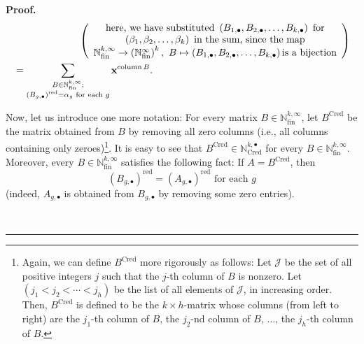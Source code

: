 \documentclass[numbers=enddot,12pt,final,onecolumn,notitlepage,abstracton]{scrartcl}%
\theoremstyle{definition}
\newenvironment{proof}[1][Proof]{\noindent\textbf{#1.} }{\ \rule{0.5em}{0.5em}}
\let\sumnonlimits\sum
\renewcommand{\sum}{\sumnonlimits\limits}
\begin{document}
\begin{proof}
\begin{align}
&  \ \ \ \ \ \ \ \ \ \ \ \ \ \ \ \ \ \ \ \ \left(
\begin{array}
[c]{c}%
\text{here, we have substituted }\left(  B_{1,\bullet},B_{2,\bullet}%
,\ldots,B_{k,\bullet}\right)  \text{ for}\\
\left(  \beta_{1},\beta_{2},\ldots,\beta_{k}\right)  \text{ in the sum, since
the map}\\
\mathbb{N}_{\operatorname*{fin}}^{k,\infty}\rightarrow\left(  \mathbb{N}%
_{\operatorname*{fin}}^{\infty}\right)  ^{k},\ B\mapsto\left(  B_{1,\bullet
},B_{2,\bullet},\ldots,B_{k,\bullet}\right)  \text{is a bijection}%
\end{array}
\right) \nonumber\\
&  =\sum_{\substack{B\in\mathbb{N}_{\operatorname*{fin}}^{k,\infty};\\\left(
B_{g,\bullet}\right)  ^{\operatorname*{red}}=\alpha_{g}\text{ for each }%
g}}\mathbf{x}^{\operatorname*{column}B}. \label{pf.prop.QSym.M*M*M.2}%
\end{align}


Now, let us introduce one more notation: For every matrix $B\in\mathbb{N}%
_{\operatorname*{fin}}^{k,\infty}$, let $B^{\operatorname*{Cred}}$ be the
matrix obtained from $B$ by removing all zero columns (i.e., all columns
containing only zeroes)\footnote{Again, we can define $B^{\operatorname*{Cred}%
}$ more rigorously as follows: Let $\mathcal{J}$ be the set of all positive
integers $j$ such that the $j$-th column of $B$ is nonzero. Let $\left(
j_{1}<j_{2}<\cdots<j_{h}\right)  $ be the list of all elements of
$\mathcal{J}$, in increasing order. Then, $B^{\operatorname*{Cred}}$ is
defined to be the $k\times h$-matrix whose columns (from left to right) are
the $j_{1}$-th column of $B$, the $j_{2}$-nd column of $B$, $\ldots$, the
$j_{h}$-th column of $B$.}. It is easy to see that $B^{\operatorname*{Cred}%
}\in\mathbb{N}_{\operatorname*{Cred}}^{k,\bullet}$ for every $B\in
\mathbb{N}_{\operatorname*{fin}}^{k,\infty}$. Moreover, every $B\in
\mathbb{N}_{\operatorname*{fin}}^{k,\infty}$ satisfies the following fact: If
$A=B^{\operatorname*{Cred}}$, then
\begin{equation}
\left(  B_{g,\bullet}\right)  ^{\operatorname*{red}}=\left(  A_{g,\bullet
}\right)  ^{\operatorname*{red}}\text{ for each }g
\label{pf.prop.QSym.M*M*M.Cred-props}%
\end{equation}
(indeed, $A_{g,\bullet}$ is obtained from $B_{g,\bullet}$ by removing some
zero entries).


\end{proof}
\end{document}
